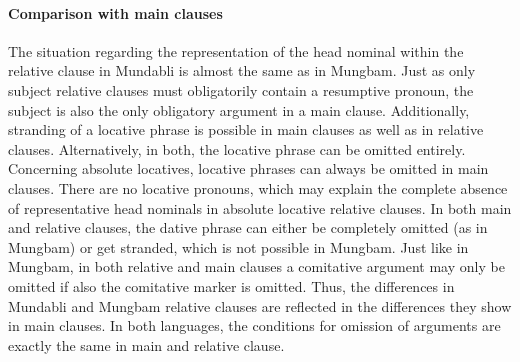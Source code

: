 \documentclass[10pt,twoside]{article}
\newcommand{\gl}[1]{`#1'}
\def\VSP{\vspace{0pt}}
\newcommand{\comment}[1]{\textcolor{blue}{\emph{#1}}}
\begin{document}
%
%
%
%
%
%
%
%
\paragraph{Comparison with main clauses}\label{secMundabliComparisonMC}

The situation regarding the representation of the head nominal within the relative clause in Mundabli 
is almost the same as in Mungbam. Just as only subject relative clauses must obligatorily contain a 
resumptive pronoun, the subject is also the only obligatory argument in a main clause. 
Additionally, stranding 
of a locative phrase is possible in main clauses as well as in relative clauses. 
Alternatively, in both, the locative phrase 
can be omitted entirely. 
Concerning absolute locatives, locative phrases can always be omitted in main clauses. 
There are no locative pronouns, which may explain the complete absence of representative head nominals in absolute 
locative relative clauses. 
In both main and relative clauses, the dative phrase can either be completely omitted (as in Mungbam) or get stranded, 
which is not possible in Mungbam. 
Just like in Mungbam, in both relative and main clauses a comitative 
argument may only be omitted if also the comitative marker is omitted. Thus, the differences in Mundabli and 
Mungbam relative clauses are reflected in the differences they show in main clauses. In both languages, the 
conditions for omission of arguments are exactly the same in main and relative clause.
\end{document}
